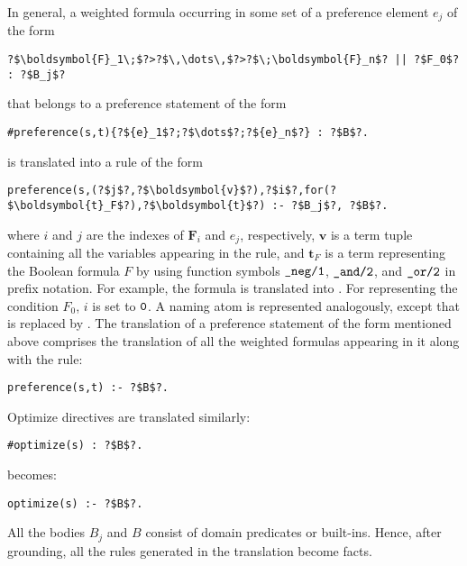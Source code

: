 In general, a weighted formula 
occurring in some set
of a preference element $e_j$ of the form 
\begin{lstlisting}[numbers=none,escapechar=?]
?$\boldsymbol{F}_1\;$?>?$\,\dots\,$?>?$\;\boldsymbol{F}_n$? || ?$F_0$? : ?$B_j$?
\end{lstlisting}
that belongs to a preference statement  of the form
\begin{lstlisting}[numbers=none,escapechar=?]
#preference(s,t){?${e}_1$?;?$\dots$?;?${e}_n$?} : ?$B$?.
\end{lstlisting}
is translated into a rule of the form
\begin{lstlisting}[numbers=none,escapechar=?]
preference(s,(?$j$?,?$\boldsymbol{v}$?),?$i$?,for(?$\boldsymbol{t}_F$?),?$\boldsymbol{t}$?) :- ?$B_j$?, ?$B$?.
\end{lstlisting}
where $i$ and $j$ are the indexes of $\boldsymbol{F}_i$ and $e_j$, respectively, 
$\boldsymbol{v}$ is a term tuple containing all the variables appearing in the rule, 
and $\boldsymbol{t}_F$ is a term representing the Boolean formula $F$ 
by using function symbols $\texttt{\_neg/1}$, $\texttt{\_and/2}$, and $\texttt{\_or/2}$ in prefix notation.
For example, 
the formula  is translated into . 
%
For representing the condition $F_0$, $i$ is set to $\texttt{0}$.
%
A naming atom  is represented analogously,
except that  is replaced by .
%
The translation of a preference statement of the form mentioned above 
comprises the translation of all the weighted formulas appearing in it
along with the rule:
\begin{lstlisting}[numbers=none,escapechar=?]
preference(s,t) :- ?$B$?.
\end{lstlisting}
Optimize directives are translated similarly:
\begin{lstlisting}[numbers=none,escapechar=?]
#optimize(s) : ?$B$?.
\end{lstlisting}
becomes:
\begin{lstlisting}[numbers=none,escapechar=?]
optimize(s) :- ?$B$?.
\end{lstlisting}

\begin{note}
All the bodies $B_j$ and $B$ consist of domain predicates or built-ins. 
Hence, after grounding, all the rules generated in the translation become facts.
\end{note}

